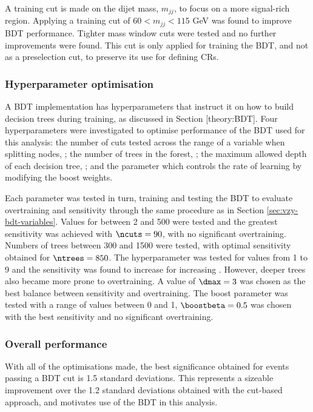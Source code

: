 A training cut is made on the dijet mass, $m_{jj}$, to focus on a more
signal-rich region. Applying a training cut of $60 < m_{jj} < 115$ GeV was found
to improve \ac{BDT} performance. Tighter mass window cuts were tested and no
further improvements were found.  This cut is only applied for training the
\ac{BDT}, and not as a preselection cut, to preserve its use for defining
\acp{CR}.

\subsubsection{Hyperparameter optimisation}

A \ac{BDT} implementation has hyperparameters that instruct it on how to build
decision trees during training, as discussed in Section [theory:BDT].
Four hyperparameters were investigated to optimise performance of the \ac{BDT}
used for this analysis: the number of cuts tested across the range of a variable
when splitting nodes, \ncuts; the number of trees in the forest, \ntrees; the
maximum allowed depth of each decision tree, \dmax; and the \boostbeta
parameter which controls the rate of learning by modifying the boost weights.

Each parameter was tested in turn, training and testing the \ac{BDT} to evaluate
overtraining and sensitivity through the same procedure as in Section
\ref{sec:vzy-bdt-variables}. Values for \ncuts between 2 and 500 were tested and
the greatest sensitivity was achieved with $\ncuts=90$, with no significant
overtraining. Numbers of trees between 300 and 1500 were tested, with optimal
sensitivity obtained for $\ntrees=850$. The \dmax hyperparameter was tested
for values from 1 to 9 and the sensitivity was found to increase for increasing
\dmax. However, deeper trees also became more prone to overtraining. A value
of $\dmax=3$ was chosen as the best balance between sensitivity and
overtraining. The boost \boostbeta parameter was tested with a range of values
between 0 and 1, $\boostbeta=0.5$ was chosen with the best sensitivity and no
significant overtraining.

\subsubsection{Overall performance}

With all of the optimisations made, the best significance obtained for events
passing a \ac{BDT} cut is 1.5 standard deviations. This represents a sizeable
improvement over the 1.2 standard deviations obtained with the cut-based
approach, and motivates use of the \ac{BDT} in this analysis.


